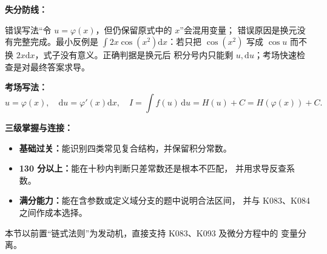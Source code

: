 \begin{knowledgeBox}
\textbf{失分防线：}

错误写法“令 \(u=\varphi(x)\)，但仍保留原式中的 \(x\)”会混用变量；
错误原因是换元没有完整完成。最小反例是
\(\int2x\cos(x^2)\mathrm dx\)：若只把 \(\cos(x^2)\) 写成
\(\cos u\) 而不换 \(2x\mathrm dx\)，式子没有意义。正确判据是换元后
积分号内只能剩 \(u,\mathrm du\)；考场快速检查是对最终答案求导。

\textbf{考场写法：}
\[
u=\varphi(x),\quad \mathrm du=\varphi'(x)\mathrm dx,
\quad I=\int f(u)\,\mathrm du=H(u)+C=H(\varphi(x))+C.
\]

\textbf{三级掌握与连接：}
\begin{itemize}
  \item \textbf{基础过关：}能识别四类常见复合结构，并保留积分常数。
  \item \textbf{130 分以上：}能在十秒内判断只差常数还是根本不匹配，
  并用求导反查系数。
  \item \textbf{满分能力：}能在含参数或定义域分支的题中说明合法区间，
  并与 K083、K084 之间作成本选择。
\end{itemize}
本节以前置“链式法则”为发动机，直接支持 K083、K093 及微分方程中的
变量分离。
\end{knowledgeBox}


\par

